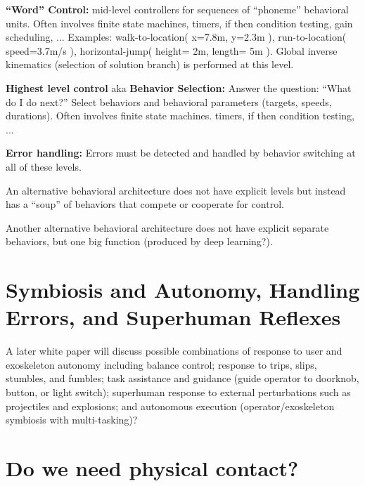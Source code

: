 \documentclass[letterpaper,12pt,fullpage]{article}
\begin{document}
{\bf ``Word'' Control:} mid-level controllers for sequences of ``phoneme'' behavioral
units.
Often involves finite state machines, timers, if then condition testing, gain
scheduling, ...
Examples: walk-to-location( x=7.8m, y=2.3m ), run-to-location( speed=3.7m/s ),
horizontal-jump( height= 2m, length= 5m ).
Global inverse kinematics (selection of solution branch) is performed at this level.

{\bf Highest level control} aka {\bf Behavior Selection:} 
Answer the question: ``What do I do next?''
Select behaviors and behavioral parameters (targets,
speeds, durations).
Often involves finite state machines. timers, if then condition testing, ...

{\bf Error handling:} Errors must be detected and handled by behavior switching
at all of these levels.

An alternative behavioral architecture does not have explicit levels but instead
has a ``soup'' of behaviors that compete or cooperate for control.

Another alternative behavioral architecture does not have explicit separate behaviors,
but one big function (produced by deep learning?).

\section{Symbiosis and Autonomy, Handling Errors, and Superhuman Reflexes}

A later white paper will discuss
possible combinations of response to user and exoskeleton
autonomy including balance control; response to trips, slips,
stumbles, and fumbles; task assistance and guidance (guide operator to
doorknob, button, or light switch); superhuman response to external
perturbations such as projectiles and explosions; and autonomous
execution (operator/exoskeleton symbiosis with multi-tasking)?

\section{Do we need physical contact?}
\end{document}
